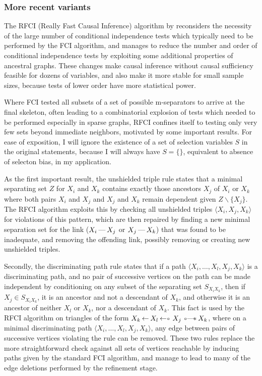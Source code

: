 \subsubsection{More recent variants}
The RFCI (Really Fast Causal Inference) algorithm by \cite{colombo_ea_2012} reconsiders the necessity of the large number of conditional independence tests which typically need to be performed by the FCI algorithm, and manages to reduce the number and order of conditional independence tests by exploiting some additional properties of ancestral graphs. These changes make causal inference without causal sufficiency feasible for dozens of variables, and also make it more stable for small sample sizes, because tests of lower order have more statistical power.


\largerpage[-1]
Where FCI tested all subsets of a set of possible m-separators to arrive at the final skeleton, often leading to a combinatorial explosion of tests which needed to be performed especially in sparse graphs, RFCI confines itself to testing only very few sets beyond immediate neighbors, motivated by some important results. For ease of exposition, I will ignore the existence of a set of selection variables $S$ in the original statements, because I will always have $S = \{\}$, equivalent to absence of selecton bias, in my application.

As the first important result, the unshielded triple rule states that a minimal separating set $Z$ for $X_i$ and $X_k$ contains exactly those ancestors $X_j$ of $X_i$ or $X_k$ where both pairs $X_i$ and $X_j$ and $X_j$ and $X_k$ remain dependent given $Z\backslash\{X_j\}$. The RFCI algorithm exploits this by checking all unshielded triples $\langle X_i, X_j, X_k \rangle$ for violations of this pattern, which are then repaired by finding a new minimal separation set for the link ($X_i \arrowLL X_j$ or $X_j \arrowLL X_k$) that was found to be inadequate, and removing the offending link, possibly removing or creating new unshielded triples.

Secondly, the discriminating path rule states that if a path $\langle X_i, \dots, X_l, X_j, X_k \rangle$ is a discriminating path, and no pair of successive vertices on the path can be made independent by conditioning on any subset of the separating set $S_{X_iX_k}$, then if $X_j \in S_{X_iX_k}$, it is an ancestor and not a descendant of $X_k$, and otherwise it is an ancestor of neither $X_l$ or $X_k$, nor a descendant of $X_k$. This fact is used by the RFCI algorithm on triangles of the form $X_k \arrowAL X_l \arrowAS X_j \arrowOS X_k$, where on a minimal discriminating path $\langle X_i, \dots, X_l, X_j, X_k \rangle$, any edge between pairs of successive vertices violating the rule can be removed. These two rules replace the more straightforward check against all sets of vertices reachable by inducing paths given by the standard FCI algorithm, and manage to lead to many of the edge deletions performed by the refinement stage.

